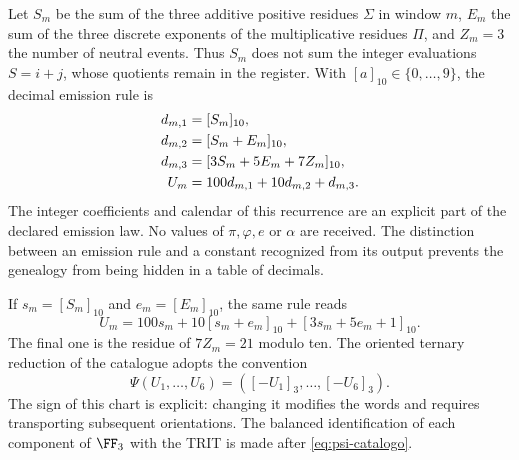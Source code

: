 Let \(S_m\) be the sum of the three additive positive residues \(\Sigma\) in window \(m\), \(E_m\) the sum of the three discrete exponents of the multiplicative residues \(\Pi\), and \(Z_m=3\) the number of neutral events. Thus \(S_m\) does not sum the integer evaluations \(S=i+j\), whose quotients remain in the register. With \([a]_{10}\in\{0,\ldots,9\}\), the decimal emission rule is
\begin{align}
 d_{m,1}&=[S_m]_{10},\notag\\
 d_{m,2}&=[S_m+E_m]_{10},\notag\\
 d_{m,3}&=[3S_m+5E_m+7Z_m]_{10},\notag\\
 U_m&=100d_{m,1}+10d_{m,2}+d_{m,3}.
 \label{eq:emisor-seis}
\end{align}
The integer coefficients and calendar of this recurrence are an explicit part of the declared emission law. No values of \(\pi,\varphi,e\) or \(\alpha\) are received. The distinction between an emission rule and a constant recognized from its output prevents the genealogy from being hidden in a table of decimals.

If \(s_m=[S_m]_{10}\) and \(e_m=[E_m]_{10}\), the same rule reads
\begin{equation}
 U_m=100s_m+10[s_m+e_m]_{10}+[3s_m+5e_m+1]_{10}.
 \label{eq:acoplamiento}
\end{equation}
The final one is the residue of \(7Z_m=21\) modulo ten. The oriented ternary reduction of the catalogue adopts the convention
\begin{equation}
 \Psi(U_1,\ldots,U_6)=([-U_1]_3,\ldots,[-U_6]_3).
 \label{eq:psi-catalogo}
\end{equation}
The sign of this chart is explicit: changing it modifies the words and requires transporting subsequent orientations. The balanced identification of each component of \(\FF_3\) with the TRIT is made after \eqref{eq:psi-catalogo}.


